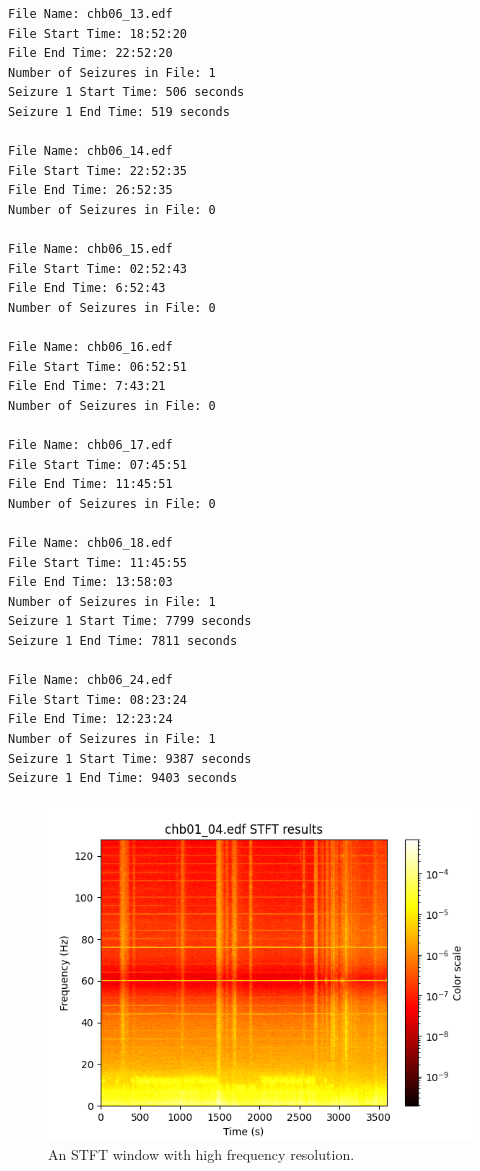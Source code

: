 \documentclass[12pt]{article}
\begin{document}
\begin{lstlisting}[style=logstyle, caption={Example Summary file from the \acrshort{chb} \acrshort{eeg} dataset.}, label={lst:summary-file}]
File Name: chb06_13.edf
File Start Time: 18:52:20
File End Time: 22:52:20
Number of Seizures in File: 1
Seizure 1 Start Time: 506 seconds
Seizure 1 End Time: 519 seconds

File Name: chb06_14.edf
File Start Time: 22:52:35
File End Time: 26:52:35
Number of Seizures in File: 0

File Name: chb06_15.edf
File Start Time: 02:52:43
File End Time: 6:52:43
Number of Seizures in File: 0

File Name: chb06_16.edf
File Start Time: 06:52:51
File End Time: 7:43:21
Number of Seizures in File: 0

File Name: chb06_17.edf
File Start Time: 07:45:51
File End Time: 11:45:51
Number of Seizures in File: 0

File Name: chb06_18.edf
File Start Time: 11:45:55
File End Time: 13:58:03
Number of Seizures in File: 1
Seizure 1 Start Time: 7799 seconds
Seizure 1 End Time: 7811 seconds

File Name: chb06_24.edf
File Start Time: 08:23:24
File End Time: 12:23:24
Number of Seizures in File: 1
Seizure 1 Start Time: 9387 seconds
Seizure 1 End Time: 9403 seconds
\end{lstlisting}


\begin{figure}[H]
\includegraphics[width=\textwidth]{stft1}
\centering
\caption{An STFT window with high frequency resolution.}
\label{fig:stft1}
\end{figure}
\end{document}
